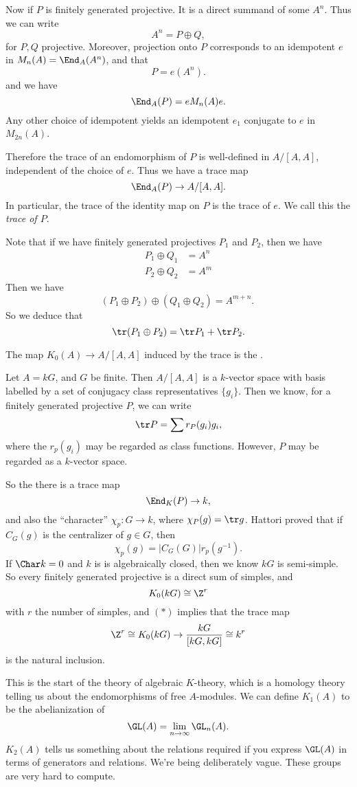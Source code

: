\documentclass[a4paper]{article}
\begin{document}
Now if $P$ is finitely generated projective. It is a direct summand of some $A^n$. Thus we can write
\[
  A^n = P \oplus Q,
\]
for $P, Q$ projective. Moreover, projection onto $P$ corresponds to an idempotent $e$ in $M_n(A) = \End_A(A^n)$, and that
\[
  P = e(A^n).
\]
and we have
\[
  \End_A(P) = e M_n(A) e.
\]
Any other choice of idempotent yields an idempotent $e_1$ conjugate to $e$ in $M_{2n}(A)$. %

Therefore the trace of an endomorphism of $P$ is well-defined in $A/[A, A]$, independent of the choice of $e$. Thus we have a trace map
\[
  \End_A(P) \to A/[A, A].
\]
In particular, the trace of the identity map on $P$ is the trace of $e$. We call this the \emph{trace of $P$}.

Note that if we have finitely generated projectives $P_1$ and $P_2$, then we have
\begin{align*}
  P_1 \oplus Q_1 &= A^n\\
  P_2 \oplus Q_2 &= A^m
\end{align*}
Then we have
\[
  (P_1 \oplus P_2) \oplus (Q_1 \oplus Q_2) = A^{m + n}.\
\]
So we deduce that
\[
  \tr (P_1 \oplus P_2) = \tr P_1 + \tr P_2.
\]
\begin{defi}
  The map $K_0(A) \to A/[A, A]$ induced by the trace is the .
\end{defi}

\begin{eg}
  Let $A = kG$, and $G$ be finite. Then $A/[A, A]$ is a $k$-vector space with basis labelled by a set of conjugacy class representatives $\{g_i\}$. Then we know, for a finitely generated projective $P$, we can write
  \[
    \tr P = \sum r_P(g_i) g_i,
  \]
  where the $r_p(g_i)$ may be regarded as class functions. However, $P$ may be regarded as a $k$-vector space.

  So the there is a trace map
  \[
    \End_K(P) \to k,
  \]
  and also the ``character'' $\chi_p: G \to k$, where $\chi_P(g) = \tr g$. Hattori proved that if $C_G(g)$ is the centralizer of $g \in G$, then
  \[
    \chi_p(g) = |C_G(G)| r_p(g^{-1}).\tag{$*$}
  \]
  If $\Char k = 0$ and $k$ is is algebraically closed, then we know $kG$ is semi-simple. So every finitely generated projective is a direct sum of simples, and
  \[
    K_0(kG) \cong \Z^r
  \]
  with $r$ the number of simples, and $(*)$ implies that the trace map
  \[
    \Z^r \cong K_0(kG) \to \frac{kG}{[kG, kG]} \cong k^r
  \]
  is the natural inclusion.
\end{eg}
This is the start of the theory of algebraic $K$-theory, which is a homology theory telling us about the endomorphisms of free $A$-modules. We can define $K_1(A)$ to be the abelianization of
\[
  \GL(A) = \lim_{n \to \infty} \GL_n(A).
\]
$K_2(A)$ tells us something about the relations required if you express $\GL(A)$ in terms of generators and relations. We're being deliberately vague. These groups are very hard to compute.
\end{document}
